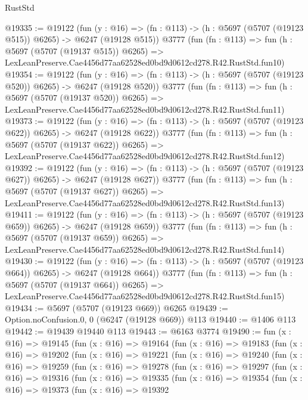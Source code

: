 \begin{lexlean}{RustStd}
\begin{coremodule}
@19335 := @19122
    (fun (y : @16) => (fn : @113) -> (h : @5697 (@5707 (@19123 @515)) @6265) -> @6247 (@19128 @515))
    @3777
    (fun (fn : @113) =>
    fun (h : @5697 (@5707 (@19137 @515)) @6265) =>
    LexLeanPreserve.Cae4456d77aa62528ed0bd9d0612cd278.R42.RustStd.fun10)
@19354 := @19122
    (fun (y : @16) => (fn : @113) -> (h : @5697 (@5707 (@19123 @520)) @6265) -> @6247 (@19128 @520))
    @3777
    (fun (fn : @113) =>
    fun (h : @5697 (@5707 (@19137 @520)) @6265) =>
    LexLeanPreserve.Cae4456d77aa62528ed0bd9d0612cd278.R42.RustStd.fun11)
@19373 := @19122
    (fun (y : @16) => (fn : @113) -> (h : @5697 (@5707 (@19123 @622)) @6265) -> @6247 (@19128 @622))
    @3777
    (fun (fn : @113) =>
    fun (h : @5697 (@5707 (@19137 @622)) @6265) =>
    LexLeanPreserve.Cae4456d77aa62528ed0bd9d0612cd278.R42.RustStd.fun12)
@19392 := @19122
    (fun (y : @16) => (fn : @113) -> (h : @5697 (@5707 (@19123 @627)) @6265) -> @6247 (@19128 @627))
    @3777
    (fun (fn : @113) =>
    fun (h : @5697 (@5707 (@19137 @627)) @6265) =>
    LexLeanPreserve.Cae4456d77aa62528ed0bd9d0612cd278.R42.RustStd.fun13)
@19411 := @19122
    (fun (y : @16) => (fn : @113) -> (h : @5697 (@5707 (@19123 @659)) @6265) -> @6247 (@19128 @659))
    @3777
    (fun (fn : @113) =>
    fun (h : @5697 (@5707 (@19137 @659)) @6265) =>
    LexLeanPreserve.Cae4456d77aa62528ed0bd9d0612cd278.R42.RustStd.fun14)
@19430 := @19122
    (fun (y : @16) => (fn : @113) -> (h : @5697 (@5707 (@19123 @664)) @6265) -> @6247 (@19128 @664))
    @3777
    (fun (fn : @113) =>
    fun (h : @5697 (@5707 (@19137 @664)) @6265) =>
    LexLeanPreserve.Cae4456d77aa62528ed0bd9d0612cd278.R42.RustStd.fun15)
@19434 := @5697 (@5707 (@19123 @669)) @6265
@19439 := Option.noConfusion.{0, 0} (@6247 (@19128 @669)) @113
@19440 := @1406 @113
@19442 := @19439 @19440 @113
@19443 := @6163 @3774
@19490 := fun (x : @16) =>
  @19145
    (fun (x : @16) =>
    @19164
      (fun (x : @16) =>
      @19183
        (fun (x : @16) =>
        @19202
          (fun (x : @16) =>
          @19221
            (fun (x : @16) =>
            @19240
              (fun (x : @16) =>
              @19259
                (fun (x : @16) =>
                @19278
                  (fun (x : @16) =>
                  @19297
                    (fun (x : @16) =>
                    @19316
                      (fun (x : @16) =>
                      @19335
                        (fun (x : @16) =>
                        @19354
                          (fun (x : @16) =>
                          @19373
                            (fun (x : @16) =>
                            @19392

\end{coremodule}
\end{lexlean}
